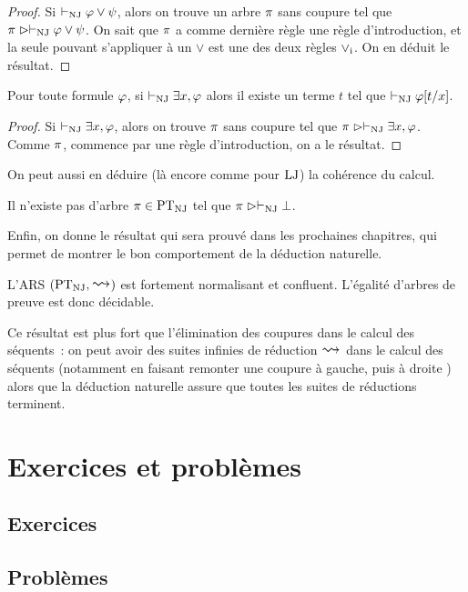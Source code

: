 \begin{proof}
  Si $\vdash_{\operatorname{NJ}}\varphi\lor\psi$, alors on trouve un arbre $\pi$ sans coupure
  tel que $\pi\mathrel{\rhd}\vdash_{\operatorname{NJ}}\varphi\lor\psi$. On sait que $\pi$ a comme
  dernière règle une règle d'introduction, et la seule pouvant s'appliquer
  à un $\lor$ est une des deux règles $\mathord{\lor}_{\mathrm{i}}$. On en déduit le résultat.
\end{proof}

\begin{property}[Témoin]
  Pour toute formule $\varphi$, si $\vdash_{\operatorname{NJ}}\exists x, \varphi$ alors il existe
  un terme $t$ tel que $\vdash_{\operatorname{NJ}}\varphi[t/x]$.
\end{property}

\begin{proof}
  Si $\vdash_{\operatorname{NJ}}\exists x, \varphi$, alors on trouve $\pi$ sans coupure tel que
  $\pi\mathrel{\rhd}\vdash_{\operatorname{NJ}}\exists x, \varphi$. Comme $\pi$, commence par une règle
  d'introduction, on a le résultat.
\end{proof}

On peut aussi en déduire (là encore comme pour $\operatorname{LJ}$) la cohérence du calcul.

\begin{property}[Cohérence]
  Il n'existe pas d'arbre $\pi \in \operatorname{PT}_{\operatorname{NJ}}$ tel que
  $\pi\mathrel{\rhd} \vdash_{\operatorname{NJ}}\bot$.
\end{property}

Enfin, on donne le résultat qui sera prouvé dans les prochaines chapitres, qui
permet de montrer le bon comportement de la déduction naturelle.

\begin{theorem}\label{thm.NJ.prop}
  L'ARS $(\ProofNJ,\reecr{})$ est fortement normalisant et confluent.
  L'égalité d'arbres de preuve est donc décidable.
\end{theorem}

\begin{remark}
  Ce résultat est plus fort que l'élimination des coupures dans le calcul des
  séquents~: on peut avoir des suites infinies de réduction $\reecr{}$ dans le
  calcul des séquents (notamment en faisant remonter une coupure à gauche, puis
  à droite ) alors que la déduction naturelle assure que
  toutes les suites de réductions terminent.
\end{remark}

\clearpage

\section{Exercices et problèmes}

\subsection{Exercices}

\clearpage

\subsection{Problèmes}
